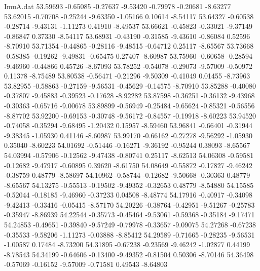 \begin{filecontents}{ImuA.dat}
  53.59693   -0.65085   -0.27637   -9.53420   -0.79978   -0.20681   -8.63277
  53.62015   -0.70708   -0.25244   -9.63350   -1.05166    0.10614   -8.54117
  53.64327   -0.60538   -0.28714   -9.43131   -1.11273    0.41910   -8.49537
  53.66621   -0.45823   -0.33021   -9.37149   -0.86847    0.37330   -8.54117
  53.68931   -0.43190   -0.31585   -9.43610   -0.86084    0.52596   -8.70910
  53.71354   -0.44865   -0.28116   -9.48515   -0.64712    0.25117   -8.65567
  53.73668   -0.58385   -0.19262   -9.49831   -0.65475    0.27407   -8.60987
  53.75960   -0.60658   -0.28594   -9.46960   -0.44866    0.45726   -8.67093
  53.78252   -0.54078   -0.29073   -9.57009   -0.50972    0.11378   -8.75489
  53.80538   -0.56471   -0.21296   -9.50309   -0.41049    0.01455   -8.73963
  53.82955   -0.58863   -0.27159   -9.56531   -0.45629   -0.14575   -8.70910
  53.85288   -0.40080   -0.37807   -9.45883   -0.39523   -0.17628   -8.92282
  53.87598   -0.36251   -0.36132   -9.43968   -0.30363   -0.65716   -9.00678
  53.89899   -0.56949   -0.25484   -9.65624   -0.85321   -0.56556   -8.87702
  53.92200   -0.69153   -0.30748   -9.56172   -0.84557   -0.19918   -8.60223
  53.94520   -0.74058   -0.35294   -9.68495   -1.20432    0.15957   -8.59460
  53.96841   -0.66401   -0.31944   -9.38345   -1.05930    0.41146   -8.60987
  53.99170   -0.66162   -0.27278   -9.56292   -1.05930    0.35040   -8.60223
  54.01692   -0.51446   -0.16271   -9.36192   -0.95244    0.38093   -8.65567
  54.03994   -0.57906   -0.12562   -9.47438   -0.80741    0.25117   -8.62513
  54.06308   -0.59581   -0.12682   -9.47917   -0.60895    0.39620   -8.61750
  54.08649   -0.55872   -0.17827   -9.46242   -0.38759    0.48779   -8.58697
  54.10962   -0.58744   -0.12682   -9.50668   -0.30363    0.48779   -8.65567
  54.13275   -0.55513   -0.19502   -9.49352   -0.32653    0.48779   -8.54880
  54.15585   -0.52044   -0.18185   -9.46960   -0.37233    0.04508   -8.48774
  54.17916   -0.40917   -0.34098   -9.42413   -0.33416   -0.05415   -8.57170
  54.20226   -0.38764   -0.42951   -9.51267   -0.25783   -0.35947   -8.86939
  54.22544   -0.35773   -0.45464   -9.53061   -0.59368   -0.35184   -9.17471
  54.24853   -0.49651   -0.39840   -9.57249   -0.79978   -0.33657   -9.09075
  54.27268   -0.67238   -0.35533   -9.58206   -1.11273   -0.03888   -8.85412
  54.29589   -0.71665   -0.28235   -9.56531   -1.00587    0.17484   -8.73200
  54.31895   -0.67238   -0.23569   -9.46242   -1.02877    0.44199   -8.78543
  54.34199   -0.64606   -0.13400   -9.49352   -0.81504    0.50306   -8.70146
  54.36498   -0.57069   -0.16152   -9.57009   -0.71581    0.49543   -8.64803

\end{filecontents}
